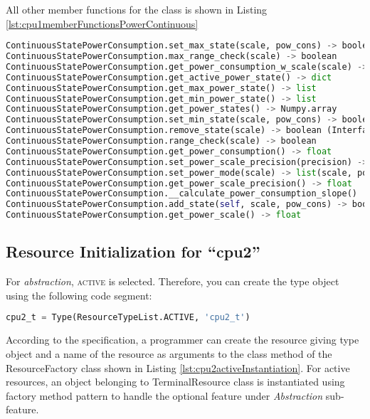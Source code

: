 \documentclass[]{scrartcl}
\begin{document}
       
All other member functions for the class is shown in Listing \ref{lst:cpu1memberFunctionsPowerContinuous}
            

\begin{lstlisting}[language=Python, frame=single, label={lst:cpu1memberFunctionsPowerContinuous}, caption={The member functions for \textsf{ContinuousStatePowerConsumption} module.}]
ContinuousStatePowerConsumption.set_max_state(scale, pow_cons) -> boolean
ContinuousStatePowerConsumption.max_range_check(scale) -> boolean
ContinuousStatePowerConsumption.get_power_consumption_w_scale(scale) -> float
ContinuousStatePowerConsumption.get_active_power_state() -> dict
ContinuousStatePowerConsumption.get_max_power_state() -> list
ContinuousStatePowerConsumption.get_min_power_state() -> list
ContinuousStatePowerConsumption.get_power_states() -> Numpy.array
ContinuousStatePowerConsumption.set_min_state(scale, pow_cons) -> boolean
ContinuousStatePowerConsumption.remove_state(scale) -> boolean (Interface Function)
ContinuousStatePowerConsumption.range_check(scale) -> boolean
ContinuousStatePowerConsumption.get_power_consumption() -> float
ContinuousStatePowerConsumption.set_power_scale_precision(precision) -> None
ContinuousStatePowerConsumption.set_power_mode(scale) -> list(scale, power consumption)
ContinuousStatePowerConsumption.get_power_scale_precision() -> float
ContinuousStatePowerConsumption.__calculate_power_consumption_slope()
ContinuousStatePowerConsumption.add_state(self, scale, pow_cons) -> boolean (Interface Function)
ContinuousStatePowerConsumption.get_power_scale() -> float
\end{lstlisting}
        
            
\subsection{Resource Initialization for ``\textsf{cpu2}''}
        
For \emph{abstraction}, \textsc{active} is selected. Therefore, you can create the type object using the following code segment:

\begin{lstlisting}[language=Python, frame=single, label={lst:activeType}, caption={Active resource type object instantiation}]
cpu2_t = Type(ResourceTypeList.ACTIVE, 'cpu2_t')
\end{lstlisting}
        
        
According to the specification, a programmer can create the resource giving type object and a name of the resource as arguments to the class method of the
ResourceFactory class shown in Listing \ref{lst:cpu2activeInstantiation}. For active resources, an object belonging to \textsf{TerminalResource} class is instantiated
using factory method pattern to handle the optional feature under \emph{Abstraction} sub-feature.
\end{document}
